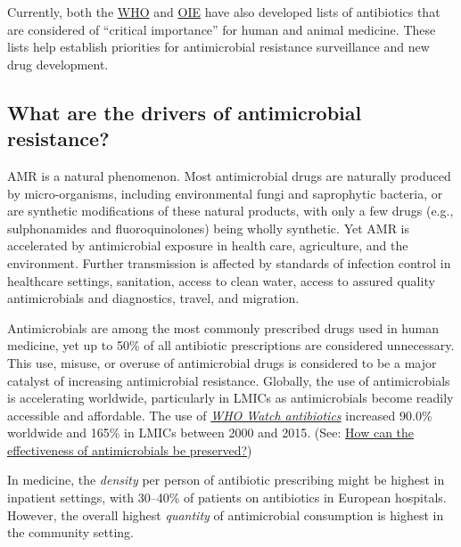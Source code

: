 \documentclass[
  11pt,
  paper=a4,
  ,captions=tableheading
]{scrartcl}
\begin{document}
Currently, both the
\href{https://apps.who.int/iris/bitstream/handle/10665/312266/9789241515528-eng.pdf}{WHO}
and
\href{https://www.oie.int/en/what-we-do/global-initiatives/antimicrobial-resistance/\#ui-id-4}{OIE}
have also developed lists of antibiotics that are considered of
``critical importance'' for human and animal medicine. These lists help
establish priorities for antimicrobial resistance surveillance and new
drug development.

\hypertarget{what-are-the-drivers-of-antimicrobial-resistance}{%
\subsection*{What are the drivers of antimicrobial
resistance?}\label{what-are-the-drivers-of-antimicrobial-resistance}}

AMR is a natural phenomenon. Most antimicrobial drugs are naturally
produced by micro-organisms, including environmental fungi and
saprophytic bacteria, or are synthetic modifications of these natural
products, with only a few drugs (e.g., sulphonamides and
fluoroquinolones) being wholly synthetic. Yet AMR is accelerated by
antimicrobial exposure in health care, agriculture, and the environment.
Further transmission is affected by standards of infection control in
healthcare settings, sanitation, access to clean water, access to
assured quality antimicrobials and diagnostics, travel, and migration.

Antimicrobials are among the most commonly prescribed drugs used in
human medicine, yet up to 50\% of all antibiotic prescriptions are
considered unnecessary. This use, misuse, or overuse of antimicrobial
drugs is considered to be a major catalyst of increasing antimicrobial
resistance. Globally, the use of antimicrobials is accelerating
worldwide, particularly in LMICs as antimicrobials become readily
accessible and affordable. The use of
\href{https://www.who.int/news/item/01-10-2019-who-releases-the-2019-aware-classification-antibiotics}{\emph{WHO
Watch antibiotics}} increased 90.0\% worldwide and 165\% in LMICs
between 2000 and 2015. (See:
\protect\hyperlink{how-can-the-effectiveness-of-antimicrobials-be-preserved}{How
can the effectiveness of antimicrobials be preserved?})

In medicine, the \emph{density} per person of antibiotic prescribing
might be highest in inpatient settings, with 30--40\% of patients on
antibiotics in European hospitals. However, the overall highest
\emph{quantity} of antimicrobial consumption is highest in the community
setting.
\end{document}
